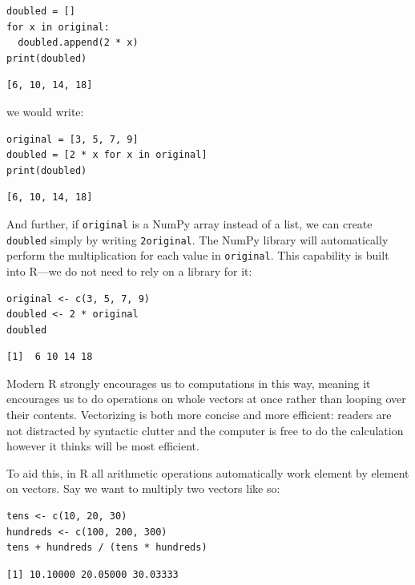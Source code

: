 \begin{lstlisting}
doubled = []
for x in original:
  doubled.append(2 * x)
print(doubled)
\end{lstlisting}

\begin{lstlisting}
[6, 10, 14, 18]
\end{lstlisting}

\noindent
we would write:

\begin{lstlisting}
original = [3, 5, 7, 9]
doubled = [2 * x for x in original]
print(doubled)
\end{lstlisting}

\begin{lstlisting}
[6, 10, 14, 18]
\end{lstlisting}

And further, if \texttt{original} is a NumPy array instead of a list,
we can create \texttt{doubled} simply by writing \texttt{2\*original}.
The NumPy library will automatically perform the multiplication for each value in \texttt{original}.
This capability is built into R---we do not need to rely on a library for it:

\begin{lstlisting}
original <- c(3, 5, 7, 9)
doubled <- 2 * original
doubled
\end{lstlisting}

\begin{lstlisting}
[1]  6 10 14 18
\end{lstlisting}

Modern R strongly encourages us to  computations in this way,
meaning it encourages us 
to do operations on whole vectors at once rather than looping over their contents.
Vectorizing is both more concise and more efficient:
readers are not distracted by syntactic clutter
and the computer is free to do the calculation however it thinks will be most efficient.

To aid this,
in R all arithmetic operations automatically work element by element on vectors. Say we want to multiply two vectors like so:

\begin{lstlisting}
tens <- c(10, 20, 30)
hundreds <- c(100, 200, 300)
tens + hundreds / (tens * hundreds)
\end{lstlisting}

\begin{lstlisting}
[1] 10.10000 20.05000 30.03333
\end{lstlisting}

